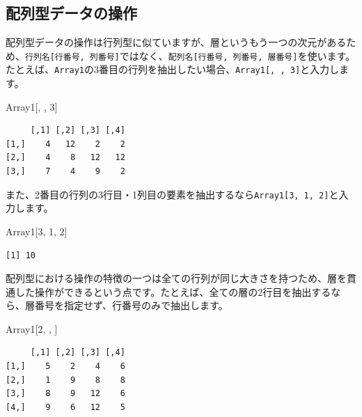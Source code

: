 \documentclass[
  a4paper,
  pandoc,
  ja=standard,
  jafont=haranoaji]{bxjsbook}
\newenvironment{Shaded}{\begin{snugshade}}{\end{snugshade}}
\newcommand{\DecValTok}[1]{\textcolor[rgb]{0.68,0.00,0.00}{#1}}
\newcommand{\NormalTok}[1]{\textcolor[rgb]{0.00,0.48,0.65}{#1}}
\begin{document}
\hypertarget{ux914dux5217ux578bux30c7ux30fcux30bfux306eux64cdux4f5c}{%
\subsection{配列型データの操作}\label{ux914dux5217ux578bux30c7ux30fcux30bfux306eux64cdux4f5c}}

配列型データの操作は行列型に似ていますが、層というもう一つの次元があるため、\texttt{行列名{[}行番号,\ 列番号{]}}ではなく、\texttt{配列名{[}行番号,\ 列番号,\ 層番号{]}}を使います。たとえば、\texttt{Array1}の3番目の行列を抽出したい場合、\texttt{Array1{[},\ ,\ 3{]}}と入力します。

\begin{Shaded}
\begin{Highlighting}[numbers=left,,]
\NormalTok{Array1[, , }\DecValTok{3}\NormalTok{]}
\end{Highlighting}
\end{Shaded}

\begin{verbatim}
     [,1] [,2] [,3] [,4]
[1,]    4   12    2    2
[2,]    4    8   12   12
[3,]    7    4    9    2
\end{verbatim}

また、2番目の行列の3行目・1列目の要素を抽出するなら\texttt{Array1{[}3,\ 1,\ 2{]}}と入力します。

\begin{Shaded}
\begin{Highlighting}[numbers=left,,]
\NormalTok{Array1[}\DecValTok{3}\NormalTok{, }\DecValTok{1}\NormalTok{, }\DecValTok{2}\NormalTok{]}
\end{Highlighting}
\end{Shaded}

\begin{verbatim}
[1] 10
\end{verbatim}

配列型における操作の特徴の一つは全ての行列が同じ大きさを持つため、層を貫通した操作ができるという点です。たとえば、全ての層の2行目を抽出するなら、層番号を指定せず、行番号のみで抽出します。

\begin{Shaded}
\begin{Highlighting}[numbers=left,,]
\NormalTok{Array1[}\DecValTok{2}\NormalTok{, , ]}
\end{Highlighting}
\end{Shaded}

\begin{verbatim}
     [,1] [,2] [,3] [,4]
[1,]    5    2    4    6
[2,]    1    9    8    8
[3,]    8    9   12    6
[4,]    9    6   12    5
\end{verbatim}
\end{document}
